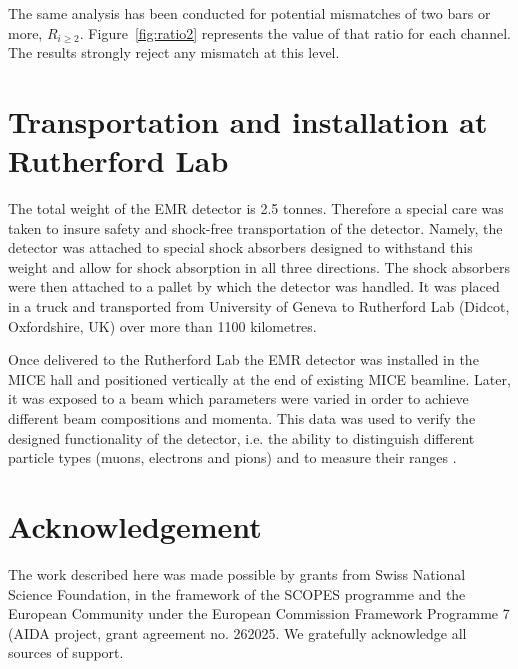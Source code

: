 \documentclass[a4paper,11pt]{article}
\begin{document}
The same analysis has been conducted for potential mismatches of two bars or more, $R_{i\geq2}$. Figure~\ref{fig:ratio2} represents the value of that ratio for each channel. The results strongly reject any mismatch at this level.

\section{Transportation and installation at Rutherford Lab}

The total weight of the EMR detector is 2.5 tonnes. Therefore a special care was taken to insure safety and shock-free transportation of the detector.
Namely, the detector was attached to special shock absorbers designed to withstand this weight and allow for shock absorption in all three directions. The
shock absorbers were then attached to a pallet by which the detector was handled. It was placed in a truck and transported from University of Geneva to
Rutherford Lab (Didcot, Oxfordshire, UK) over more than 1100 kilometres. 

Once delivered to the Rutherford Lab the EMR detector was installed in the MICE hall and positioned vertically at the end of existing MICE beamline. Later,
it was exposed to a beam which parameters were varied in order to achieve different beam compositions and momenta. This data was used to verify the designed
functionality of the detector, i.e. the ability to distinguish different particle types (muons, electrons and pions) and to measure their ranges
\cite{performance}. 

\section*{Acknowledgement}
The work described here was made possible by grants from Swiss National Science Foundation, in the framework of the SCOPES programme and the European Community
under the European Commission Framework Programme 7 (AIDA project, grant agreement no. 262025. We gratefully acknowledge all sources of support.




\end{document}
